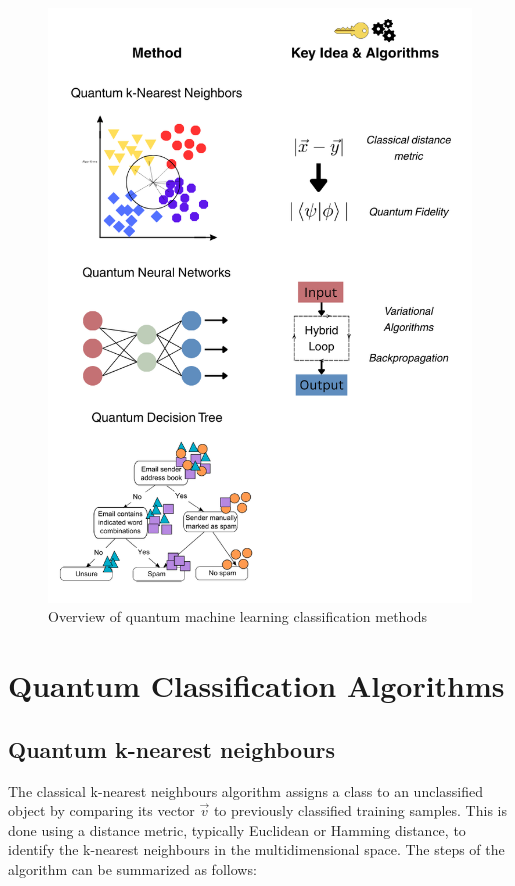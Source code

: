 \documentclass{article}
\begin{document}
  \begin{figure}[h!]
    \centering
    \includegraphics[scale=0.3]{"figures/Overview QML.png"}
    \caption{Overview of quantum machine learning classification methods}
    \label{fig:overview}
  \end{figure}

\section*{Quantum Classification Algorithms}
\subsection*{Quantum k-nearest neighbours}
The classical k-nearest neighbours algorithm assigns a class to an unclassified object by comparing its vector $\vec{v}$ to previously classified training samples. This is done using a distance metric, typically Euclidean or Hamming distance, to identify the k-nearest neighbours in the multidimensional space. The steps of the algorithm can be summarized as follows:
\end{document}
